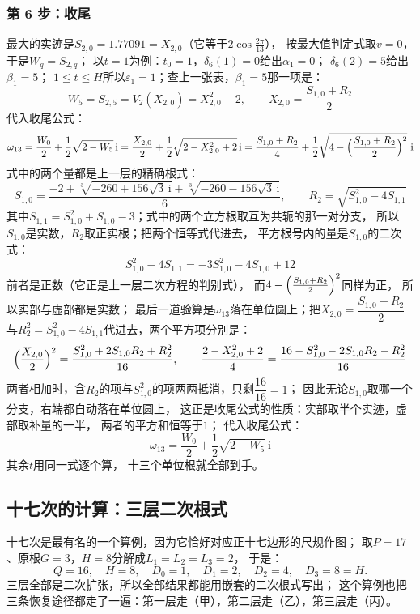 \documentclass[UTF8,a4paper,11pt]{ctexart}
\newcommand{\ii}{\mathrm{i}}
\begin{document}
\subsubsection{第 6 步：收尾}
最大的实迹是$S_{2,0}=1.77091=X_{2,0}$（它等于$2\cos\frac{2\pi}{13}$），
按最大值判定式取$v=0$，于是$W_q=S_{2,q}$；
以$t=1$为例：$t_0=1$，$\delta_6(1)=0$给出$\alpha_1=0$；
$\delta_6(2)=5$给出$\beta_1=5$；
$1\le t\le H$所以$\varepsilon_1=1$；查上一张表，$\beta_1=5$那一项是：
\[
 W_5=S_{2,5}=V_2(X_{2,0})=X_{2,0}^2-2,\qquad X_{2,0}=\frac{S_{1,0}+R_2}{2}
\]
代入收尾公式：
\[
 \omega_{13}=\frac{W_0}{2}+\frac12\sqrt{2-W_5}\,\ii
 =\frac{X_{2,0}}{2}+\frac12\sqrt{2-X_{2,0}^2+2}\,\ii
 =\frac{S_{1,0}+R_2}{4}+\frac12\sqrt{4-\Bigl(\frac{S_{1,0}+R_2}{2}\Bigr)^2}\ \ii
\]
式中的两个量都是上一层的精确根式：
\[
 S_{1,0}=\frac{-2+\sqrt[3]{-260+156\sqrt3\,\ii}+\sqrt[3]{-260-156\sqrt3\,\ii}}{6},
 \qquad R_2=\sqrt{S_{1,0}^2-4S_{1,1}}
\]
其中$S_{1,1}=S_{1,0}^2+S_{1,0}-3$；式中的两个立方根取互为共轭的那一对分支，
所以$S_{1,0}$是实数，$R_2$取正实根；把两个恒等式代进去，
平方根号内的量是$S_{1,0}$的二次式：
\[
 S_{1,0}^2-4S_{1,1}=-3S_{1,0}^2-4S_{1,0}+12
\]
前者是正数（它正是上一层二次方程的判别式），
而$4-\Bigl(\frac{S_{1,0}+R_2}{2}\Bigr)^2$同样为正，
所以实部与虚部都是实数；
最后一道验算是$\omega_{13}$落在单位圆上；把$X_{2,0}=\dfrac{S_{1,0}+R_2}{2}$
与$R_2^2=S_{1,0}^2-4S_{1,1}$代进去，两个平方项分别是：
\[
 \Bigl(\frac{X_{2,0}}{2}\Bigr)^2=\frac{S_{1,0}^2+2S_{1,0}R_2+R_2^2}{16},
 \qquad
 \frac{2-X_{2,0}^2+2}{4}=\frac{16-S_{1,0}^2-2S_{1,0}R_2-R_2^2}{16}
\]
两者相加时，含$R_2$的项与$S_{1,0}^2$的项两两抵消，只剩$\dfrac{16}{16}=1$；
因此无论$S_{1,0}$取哪一个分支，右端都自动落在单位圆上，
这正是收尾公式的性质：实部取半个实迹，虚部取补量的一半，
两者的平方和恒等于$1$；
代入收尾公式：
\[
 \omega_{13}=\frac{W_0}{2}+\frac12\sqrt{2-W_5}\ \ii
\]
其余$t$用同一式逐个算，
十三个单位根就全部到手。
\subsection{十七次的计算：三层二次根式}
十七次是最有名的一个算例，因为它恰好对应正十七边形的尺规作图；
取$P=17$、原根$G=3$，$H=8$分解成$L_1=L_2=L_3=2$，
于是：
\[
 Q=16,\quad H=8,\quad D_0=1,\quad D_1=2,\quad D_2=4,\quad D_3=8=H.
\]
三层全部是二次扩张，所以全部结果都能用嵌套的二次根式写出；
这个算例也把三条恢复途径都走了一遍：第一层走（甲），第二层走（乙），第三层走（丙）。
\end{document}
